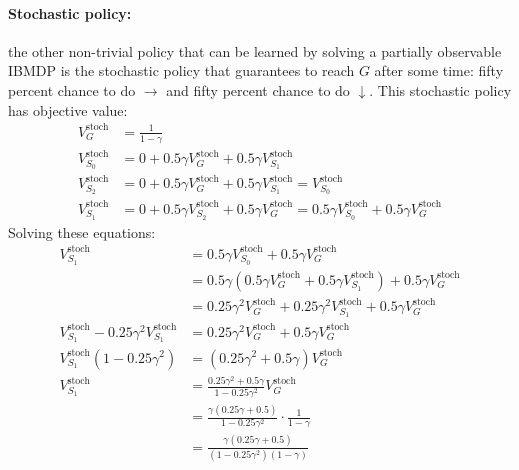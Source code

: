 \paragraph{Stochastic policy:} the other non-trivial policy that can be learned by solving a partially observable IBMDP is the stochastic policy that guarantees to reach $G$ after some time: fifty percent chance to do $\rightarrow$ and fifty percent chance to do $\downarrow$.
This stochastic policy has objective value:
\begin{align*}
    V^{\text{stoch}}_G &= \frac{1}{1-\gamma} \\
    V^{\text{stoch}}_{S_0} &= 0 + 0.5\gamma V^{\text{stoch}}_G + 0.5\gamma V^{\text{stoch}}_{S_1} \\
    V^{\text{stoch}}_{S_2} &= 0 + 0.5\gamma V^{\text{stoch}}_G + 0.5\gamma V^{\text{stoch}}_{S_1} = V^{\text{stoch}}_{S_0} \\
    V^{\text{stoch}}_{S_1} &= 0 + 0.5\gamma V^{\text{stoch}}_{S_2} + 0.5\gamma V^{\text{stoch}}_G = 0.5\gamma V^{\text{stoch}}_{S_0} + 0.5\gamma V^{\text{stoch}}_G
\end{align*}
Solving these equations:
\begin{align*}
    V^{\text{stoch}}_{S_1} &= 0.5\gamma V^{\text{stoch}}_{S_0} + 0.5\gamma V^{\text{stoch}}_G \\
    &= 0.5\gamma (0.5\gamma V^{\text{stoch}}_G + 0.5\gamma V^{\text{stoch}}_{S_1}) + 0.5\gamma V^{\text{stoch}}_G \\
    &= 0.25\gamma^2 V^{\text{stoch}}_G + 0.25\gamma^2 V^{\text{stoch}}_{S_1} + 0.5\gamma V^{\text{stoch}}_G \\
    V^{\text{stoch}}_{S_1} - 0.25\gamma^2 V^{\text{stoch}}_{S_1} &= 0.25\gamma^2 V^{\text{stoch}}_G + 0.5\gamma V^{\text{stoch}}_G \\
    V^{\text{stoch}}_{S_1}(1 - 0.25\gamma^2) &= (0.25\gamma^2 + 0.5\gamma) V^{\text{stoch}}_G \\
    V^{\text{stoch}}_{S_1} &= \frac{0.25\gamma^2 + 0.5\gamma}{1 - 0.25\gamma^2} V^{\text{stoch}}_G \\
    &= \frac{\gamma(0.25\gamma + 0.5)}{1 - 0.25\gamma^2} \cdot \frac{1}{1-\gamma} \\
    &= \frac{\gamma(0.25\gamma + 0.5)}{(1 - 0.25\gamma^2)(1-\gamma)}
\end{align*}
